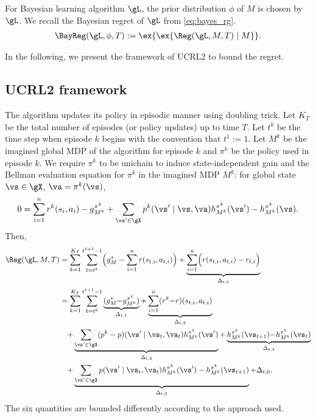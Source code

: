For Bayesian learning algorithm $\gL$, the prior distribution $\phi$ of $M$ is chosen by  $\gL$.
We recall the Bayesian regret of $\gL$ from \eqref{eq:bayes_rg}.
\begin{align}
    \BayReg(\gL, \phi, T) := \ex{\ex{\Reg(\gL, M, T) \mid M}}.
\end{align}

In the following, we present the framework of UCRL2 to bound the regret.

\subsection{UCRL2 framework}

The algorithm updates its policy in episodic manner using doubling trick.
Let $K_T$ be the total number of episodes (or policy updates) up to time $T$.
Let $t^k$ be the time step when episode $k$ begins with the convention that $t^1:=1$.
Let $M^k$ be the imagined global MDP of the algorithm for episode $k$ and $\pi^k$ be the policy used in episode $k$.
We require $\pi^k$ to be unichain to induce state-independent gain and the Bellman evaluation equation for $\pi^k$ in the imagined MDP $M^k$: for global state $\vs\in\gX$, $\va=\pi^k(\vs)$,
\begin{align*}
    0 =  \sum_{i=1}^nr^k(s_i, a_i) -g^{\pi^k}_{M^k} +\sum_{\vs'\in\gX}p^k(\vs' \mid \vs, \va)h^{\pi^k}_{M^k}(\vs') -h^{\pi^k}_{M^k}(\vs).
\end{align*}
Then,
\begin{align*}
    \Reg(\gL, M, T)
    &= \sum_{k=1}^{K_T}\sum_{t=t^k}^{t^{k+1}-1} \Bigl(g^*_M -\sum_{i=1}^{n}r(s_{t,i},a_{t,i})\Bigr) +\underbrace{\sum_{i=1}^{n}\Bigl(r(s_{t,i},a_{t,i})-r_{t,i}\Bigr)}_{\Delta_{t,0}} \\
    &=\sum_{k=1}^{K_T}\sum_{t=t^k}^{t^{k+1}-1} \underbrace{(g^*_M{-}g^{\pi^k}_{M^k})}_{\Delta_{t,1}} {+}\underbrace{\sum_{i=1}^n(r^k{-}r)(s_{t,i},a_{t,i})}_{\Delta_{t,2}} \\
    &\quad {+}\underbrace{\sum_{\vs'\in\gX}(p^k-p)(\vs' \mid \vs_t, \va_t)h^{\pi^k}_{M^k}(\vs')}_{\Delta_{t,3}} {+}\underbrace{h^{\pi^k}_{M^k}(\vs_{t+1}){-}h^{\pi^k}_{M^k}(\vs_{t})}_{\Delta_{t,4}} \\
    &\quad {+}\underbrace{\sum_{\vs'\in\gX} p(\vs' \mid \vs_t, \va_t)h^{\pi^k}_{M^k}(\vs')-h^{\pi^k}_{M^k}(\vs_{t+1})}_{\Delta_{t,5}} +\Delta_{t,0}.
\end{align*}
The six quantities are bounded differently according to the approach used.

